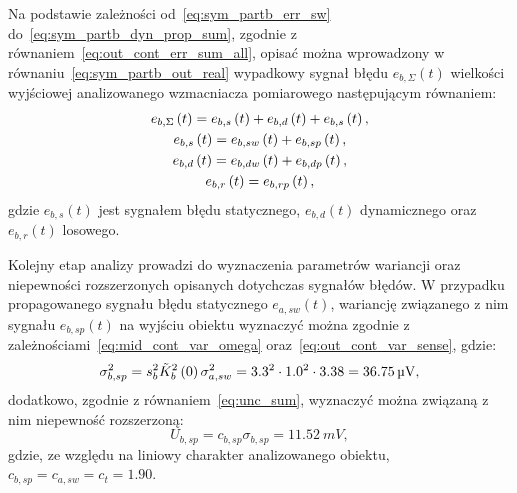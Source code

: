 Na podstawie zależności od~\eqref{eq:sym_partb_err_sw} do~\eqref{eq:sym_partb_dyn_prop_sum}, zgodnie z równaniem~\eqref{eq:out_cont_err_sum_all}, opisać można wprowadzony w równaniu~\eqref{eq:sym_partb_out_real} wypadkowy sygnał błędu $e_{b,\Sigma}(t)$ wielkości wyjściowej analizowanego wzmacniacza pomiarowego następującym równaniem:
\begin{gather}
e_{b,\Sigma} \left(t\right) = e_{b,s} \left(t\right) + e_{b,d} \left(t\right) + e_{b,s} \left(t\right) \label{eq:sym_partb_error_sum}, \\
e_{b,s} \left(t\right) = e_{b,sw} \left(t\right) + e_{b,sp} \left(t\right) \label{eq:sym_partb_error_stat}, \\
e_{b,d} \left(t\right) = e_{b,dw} \left(t\right) + e_{b,dp} \left(t\right) \label{eq:sym_partb_error_dyn}, \\
e_{b,r} \left(t\right) = e_{b,rp} \left(t\right) \label{eq:sym_partb_error_rand},
\end{gather}
gdzie $e_{b,s}(t)$ jest sygnałem błędu statycznego, $e_{b,d}(t)$ dynamicznego oraz $e_{b,r}(t)$ losowego.

Kolejny etap analizy prowadzi do wyznaczenia parametrów wariancji oraz niepewności rozszerzonych opisanych dotychczas sygnałów błędów. W przypadku propagowanego sygnału błędu statycznego $e_{a,sw}(t)$, wariancję związanego z nim sygnału $e_{b,sp}(t)$ na wyjściu obiektu wyznaczyć można zgodnie z zależnościami~\eqref{eq:mid_cont_var_omega} oraz~\eqref{eq:out_cont_var_sense}, gdzie:
\begin{equation}
\sigma_{b,sp}^{2} = s_{b}^{2} \tilde{K}_{b}^{2} \left(0\right) \sigma_{a,sw}^{2} = 3.3^{2} \cdot 1.0^{2} \cdot 3.38 = \qty{36.75}{\micro V} \label{eq:sym_partb_var_stat_prop},
\end{equation}
dodatkowo, zgodnie z równaniem~\eqref{eq:unc_sum}, wyznaczyć można związaną z nim niepewność rozszerzoną:
\begin{equation}
U_{b,sp} = c_{b,sp} \sigma_{b,sp} = \qty{11.52}{mV} \label{eq:sym_partb_unc_stat_prop},
\end{equation}
gdzie, ze względu na liniowy charakter analizowanego obiektu, $c_{b,sp} = c_{a,sw} = c_{t} = 1.90$.

